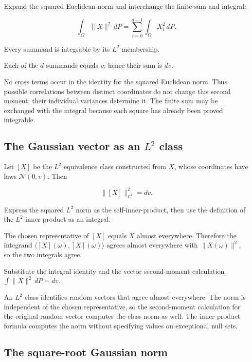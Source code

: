 \documentclass[11pt,a4paper]{report}
\begin{document}
Expand the squared Euclidean norm and interchange the finite sum and integral:

\[\int_\Omega\|X\|^2\,dP=\sum_{i=0}^{d-1}\int_\Omega X_i^2\,dP.\]

Every summand is integrable by its \(L^2\) membership.



Each of the \(d\) summands equals \(v\); hence their sum is \(dv\).



No cross terms occur in the identity for the squared Euclidean norm. Thus possible correlations between distinct coordinates do not change this second moment; their individual variances determine it. The finite sum may be exchanged with the integral because each square has already been proved integrable.

\subsection{\texorpdfstring{The Gaussian vector as an \(L^2\) class}{The Gaussian vector as an L² class}}
\label{report-step-UnadjustedLangevin-GaussianMoments-lean-4}


Let \([X]\) be the \(L^2\) equivalence class constructed from \(X\), whose coordinates have laws \(\mathcal N(0,v)\). Then

\[\|[X]\|_{L^2}^2=dv.\]

Express the squared \(L^2\) norm as the self-inner-product, then use the definition of the \(L^2\) inner product as an integral.



The chosen representative of \([X]\) equals \(X\) almost everywhere. Therefore the integrand \(\langle[X](\omega),[X](\omega)\rangle\) agrees almost everywhere with \(\|X(\omega)\|^2\), so the two integrals agree.



Substitute the integral identity and the vector second-moment calculation \(\int\|X\|^2\,dP=dv\).



An \(L^2\) class identifies random vectors that agree almost everywhere. The norm is independent of the chosen representative, so the second-moment calculation for the original random vector computes the class norm as well. The inner-product formula computes the norm without specifying values on exceptional null sets.

\subsection{\texorpdfstring{The square-root Gaussian norm}{The square-root Gaussian norm}}
\label{report-step-UnadjustedLangevin-GaussianMoments-lean-5}
\end{document}
